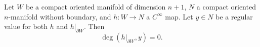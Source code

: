 Let $W$ be a compact oriented manifold of dimension $n+1$, $N$ a compact oriented $n$-manifold without boundary, and $h \colon W \to N$ a $C^{\infty}$ map. Let $y \in N$ be a regular value for both $h$ and $h|_{\partial W}$. Then
$$\deg(h|_{\partial W}, y) = 0.$$
